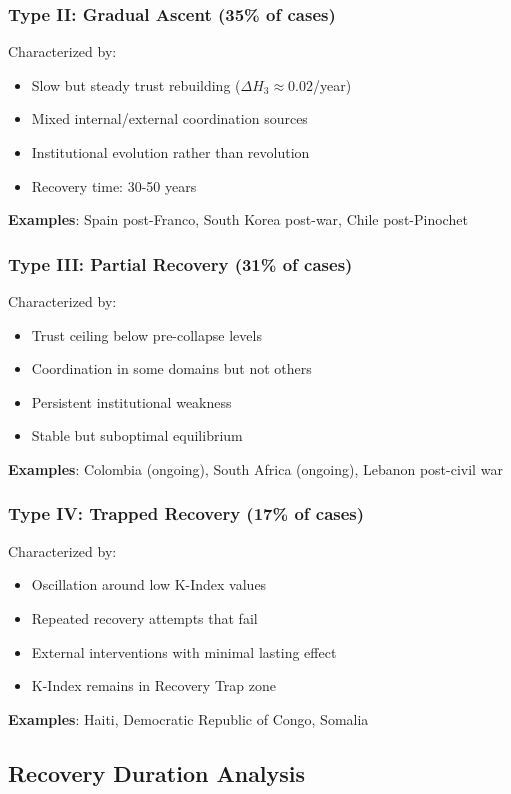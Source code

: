 \documentclass[11pt,letterpaper]{article}
\begin{document}
\subsubsection{Type II: Gradual Ascent (35\% of cases)}
Characterized by:
\begin{itemize}
\item Slow but steady trust rebuilding ($\Delta H_3 \approx 0.02$/year)
\item Mixed internal/external coordination sources
\item Institutional evolution rather than revolution
\item Recovery time: 30-50 years
\end{itemize}
\textbf{Examples}: Spain post-Franco, South Korea post-war, Chile post-Pinochet

\subsubsection{Type III: Partial Recovery (31\% of cases)}
Characterized by:
\begin{itemize}
\item Trust ceiling below pre-collapse levels
\item Coordination in some domains but not others
\item Persistent institutional weakness
\item Stable but suboptimal equilibrium
\end{itemize}
\textbf{Examples}: Colombia (ongoing), South Africa (ongoing), Lebanon post-civil war

\subsubsection{Type IV: Trapped Recovery (17\% of cases)}
Characterized by:
\begin{itemize}
\item Oscillation around low K-Index values
\item Repeated recovery attempts that fail
\item External interventions with minimal lasting effect
\item K-Index remains in Recovery Trap zone
\end{itemize}
\textbf{Examples}: Haiti, Democratic Republic of Congo, Somalia

\subsection{Recovery Duration Analysis}
\end{document}
